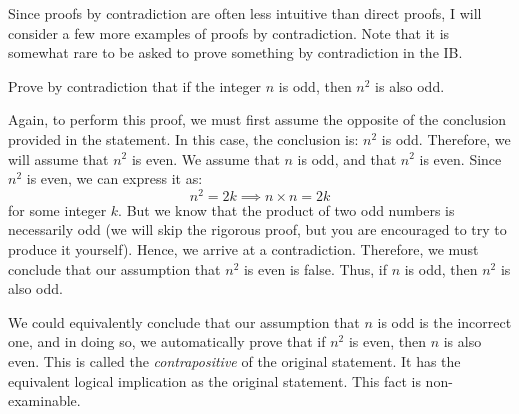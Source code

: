 Since proofs by contradiction are often less intuitive than direct proofs, I will consider a few more examples
of proofs by contradiction. Note that it is somewhat rare to be asked to prove something by contradiction in 
the IB. 

\begin{exercise}[Medium]
    Prove by contradiction that if the integer $n$ is odd, then $n^2$ is also odd.
\end{exercise}
\begin{answer}
    Again, to perform this proof, we must first assume the opposite of the conclusion provided 
    in the statement. In this case, the conclusion is: $n^2$ is odd. Therefore, we will assume that $n^2$ is even. 
    \newline\newline
    We assume that $n$ is odd, and that $n^2$ is even. Since $n^2$ is even, we can express it as:
    \begin{equation*}
        n^2 = 2k \implies n \times n = 2k
    \end{equation*}
    for some integer $k$. 
    But we know that the product of two odd numbers is necessarily odd (we will skip the rigorous proof, but you are 
    encouraged to try to produce it yourself). Hence, we arrive at a contradiction. Therefore, we must conclude that 
    our assumption that $n^2$ is even is false. Thus, if $n$ is odd, then $n^2$ is also odd. 
    
    We could equivalently
    conclude that our assumption that $n$ is odd is the incorrect one, and in doing so, we automatically prove that
    if $n^2$ is even, then $n$ is also even. This is called the \textit{contrapositive} of the original statement. 
    It has the equivalent logical implication as the original statement. This fact is non-examinable.
\end{answer}

